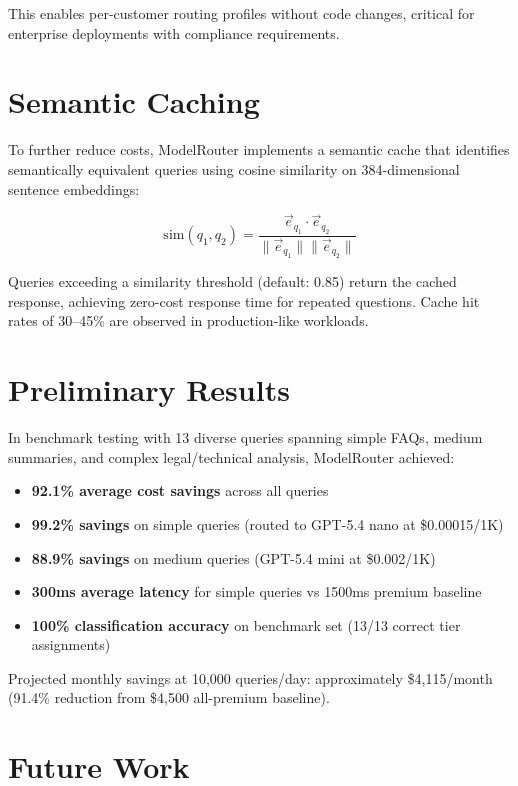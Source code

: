 \documentclass[11pt,a4paper]{article}
\begin{document}
This enables per-customer routing profiles without code changes, critical for enterprise deployments with compliance requirements.

\section{Semantic Caching}

To further reduce costs, ModelRouter implements a semantic cache that identifies semantically equivalent queries using cosine similarity on 384-dimensional sentence embeddings:

\begin{equation}
\text{sim}(q_1, q_2) = \frac{\vec{e}_{q_1} \cdot \vec{e}_{q_2}}{\|\vec{e}_{q_1}\| \|\vec{e}_{q_2}\|}
\end{equation}

Queries exceeding a similarity threshold (default: 0.85) return the cached response, achieving zero-cost response time for repeated questions. Cache hit rates of 30--45\% are observed in production-like workloads.

\section{Preliminary Results}

In benchmark testing with 13 diverse queries spanning simple FAQs, medium summaries, and complex legal/technical analysis, ModelRouter achieved:

\begin{itemize}
    \item \textbf{92.1\% average cost savings} across all queries
    \item \textbf{99.2\% savings} on simple queries (routed to GPT-5.4 nano at \$0.00015/1K)
    \item \textbf{88.9\% savings} on medium queries (GPT-5.4 mini at \$0.002/1K)
    \item \textbf{300ms average latency} for simple queries vs 1500ms premium baseline
    \item \textbf{100\% classification accuracy} on benchmark set (13/13 correct tier assignments)
\end{itemize}

Projected monthly savings at 10,000 queries/day: approximately \$4,115/month (91.4\% reduction from \$4,500 all-premium baseline).

\section{Future Work}
\end{document}
